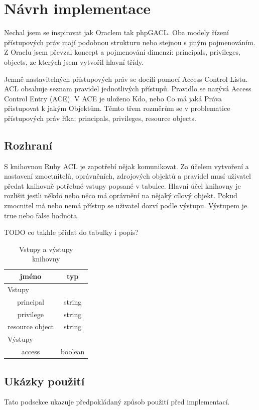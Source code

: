 \documentclass[11pt,twoside,a4paper]{book}
\begin{document}
\section{Návrh implementace}
Nechal jsem se inspirovat jak Oraclem tak phpGACL. Oba modely řízení přístupových práv mají podobnou strukturu nebo stejnou s jiným pojmenováním. Z Oraclu jsem převzal koncept a pojmenování dimenzí: principals, privileges, objects, ze kterých jsem vytvořil hlavní třídy. 

Jemně nastavitelných přístupových práv se docílí pomocí Access Control Listu. ACL obsahuje seznam pravidel jednotlivých přístupů. Pravidlo se nazývá Access Control Entry (ACE). V ACE je uloženo Kdo, nebo Co má jaká Práva přistupovat k jakým Objektům. Těmto třem rozměrům se v problematice přístupových práv říka: principals, privileges, resource objects.



\subsection{Rozhraní}

S knihovnou Ruby ACL je zapotřebí nějak komunikovat. Za účelem vytvoření a nastavení zmoctnitelů, oprávněních, zdrojových objektů a pravidel musí uživatel předat knihovně potřebné vstupy popsané v tabulce. Hlavní účel knihovny je rozlišit jestli někdo nebo něco má oprávnění na nějaký cílový objekt. Pokud zmocnitel má nebo nemá přístup se uživatel dozví podle výstupu. Výstupem je true nebo false hodnota.

TODO co takhle přidat do tabulky i popis?

\begin{table}%
\centering
\begin{tabular}{|c|c|}
\hline
\textbf{jméno} & \textbf{typ} \\
\hline
\multicolumn{2}{|l|}{Vstupy} \\
\hline
principal & string\\
\hline
privilege & string\\
\hline
resource object & string\\
\hline
\hline
\multicolumn{2}{|l|}{Výstupy} \\
\hline
access & boolean\\
\hline
\end{tabular}
\caption{Vstupy a výstupy knihovny}
\end{table}

\subsection{Ukázky použití}
Tato podsekce ukazuje předpokládaný způsob použití před implementací.
\end{document}
